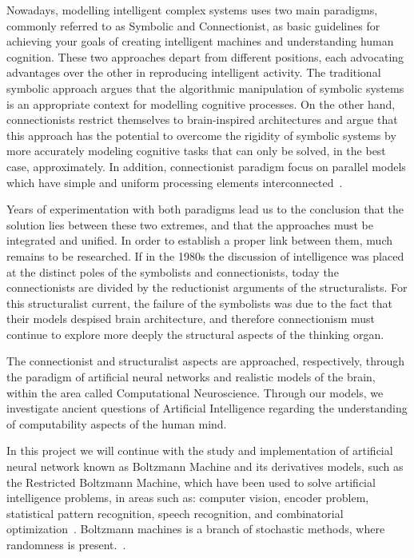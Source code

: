 Nowadays, modelling intelligent complex systems uses two main paradigms, commonly referred to as Symbolic and Connectionist, as basic guidelines for achieving your goals of creating intelligent machines and understanding human cognition. 
These two approaches depart from different positions, each advocating advantages over the other in reproducing intelligent activity. 
The traditional symbolic approach argues that the algorithmic manipulation of symbolic systems is an appropriate context for modelling cognitive processes. 
On the other hand, connectionists restrict themselves to brain-inspired architectures and argue that this approach has the potential to overcome the rigidity of symbolic systems by more accurately modeling cognitive tasks that can only be solved, in the best case, approximately. In addition, connectionist paradigm focus on parallel models which have simple and uniform processing elements interconnected~\cite{bib:sun2001}. 

Years of experimentation with both paradigms lead us to the conclusion that the solution lies between these two extremes, and that the approaches must be integrated and unified. 
In order to establish a proper link between them, much remains to be researched.
If in the 1980s the discussion of intelligence was placed at the distinct poles of the symbolists and connectionists, today the connectionists are divided by the reductionist arguments of the structuralists. 
For this structuralist current, the failure of the symbolists was due to the fact that their models despised brain architecture, and therefore connectionism must continue to explore more deeply the structural aspects of the thinking organ. 

The connectionist and structuralist aspects are approached, respectively, through the paradigm of artificial neural networks and realistic models of the brain, within the area called Computational Neuroscience. 
Through our models, we investigate ancient questions of Artificial Intelligence regarding the understanding of computability aspects of the human mind.

In this project we will continue with the study and implementation of artificial neural network known as Boltzmann Machine and its derivatives models, such as the Restricted Boltzmann Machine, which have been used to solve artificial intelligence problems, in areas such as: computer vision, encoder problem, statistical pattern recognition, speech recognition, and combinatorial optimization~\cite{bib:hertz1991}.
Boltzmann machines is a branch of stochastic methods, where randomness is present.~\cite{bib:duda2000}.


